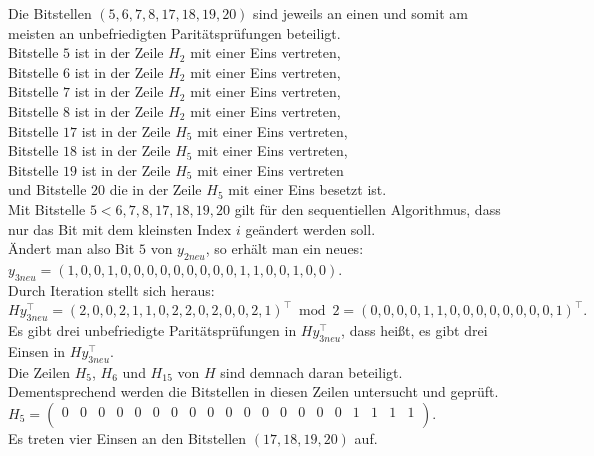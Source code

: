 \begin{Beispiel}
    Die Bitstellen $(5, 6, 7, 8, 17, 18, 19, 20)$ sind jeweils an einen und somit am meisten an unbefriedigten Paritätsprüfungen beteiligt.\\  
    Bitstelle $5$ ist in der Zeile $H_{2}$ mit einer Eins vertreten,\\ 
    Bitstelle $6$ ist in der Zeile $H_{2}$ mit einer Eins vertreten,\\ 
    Bitstelle $7$ ist in der Zeile $H_{2}$ mit einer Eins vertreten,\\ 
    Bitstelle $8$ ist in der Zeile $H_{2}$ mit einer Eins vertreten,\\ 
    Bitstelle $17$ ist in der Zeile $H_{5}$ mit einer Eins vertreten,\\ 
    Bitstelle $18$ ist in der Zeile $H_{5}$ mit einer Eins vertreten,\\ 
    Bitstelle $19$ ist in der Zeile $H_{5}$ mit einer Eins vertreten \\      
    und Bitstelle $20$ die in der Zeile $H_{5}$ mit einer Eins besetzt ist.\\ 
    Mit Bitstelle $5 < 6, 7, 8, 17, 18, 19, 20$ gilt für den sequentiellen Algorithmus, dass nur das Bit mit dem kleinsten Index $i$ geändert werden soll.\\
    
    Ändert man also Bit $5$ von $y_{2neu}$, so erhält man ein neues:\\
    $y_{3neu}= (1,0,0,1,0,0,0,0,0,0,0,0,0,1,1,0,0,1,0,0).$\\
    
    Durch Iteration stellt sich heraus:\\
    $Hy_{3neu}^\intercal= (2,0,0,2,1,1,0,2,2,0,2,0,0,2,1)^\intercal \bmod 2= (0,0,0,0,1,1,0,0,0,0,0,0,0,0,1)^\intercal.$\\
    
    Es gibt drei unbefriedigte Paritätsprüfungen in $Hy_{3neu}^\intercal$,
    dass hei\ss{}t, es gibt drei Einsen in $Hy_{3neu}^\intercal.$\\
    Die Zeilen $H_5$, $H_6$ und $H_{15}$ von $H$ sind demnach daran beteiligt.\\ 
    Dementsprechend werden die Bitstellen in diesen Zeilen untersucht und geprüft.\\
    
    $H_5= \left( \begin{array}{rrrrrrrrrrrrrrrrrrrr}
        0 & 0 & 0 & 0 & 0 & 0 & 0 & 0 & 0 & 0 & 0 & 0 & 0 & 0 & 0 & 0 & 1 & 1 & 1 & 1 \\
       \end{array}\right). 
    $\\
    Es treten vier Einsen an den Bitstellen $(17, 18, 19, 20)$ auf.\\
    

\end{Beispiel}
